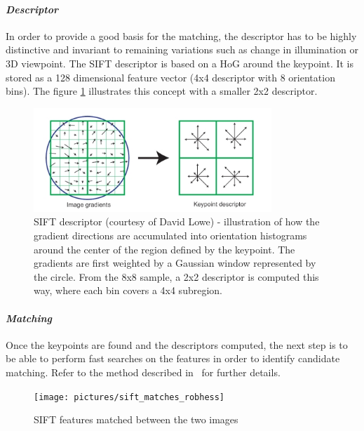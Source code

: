 \paragraph{\emph{Descriptor}}

In order to provide a good basis for the matching, the descriptor has to be highly distinctive and invariant to remaining variations such as change in illumination or 3D viewpoint. The \gls{SIFT} descriptor is based on a \gls{HoG} around the keypoint. It is stored as a 128 dimensional feature vector (4x4 descriptor with 8 orientation bins). The figure \ref{fig:sift_descriptor} illustrates this concept with a smaller 2x2 descriptor.

\begin{figure}[h]
\centering
\includegraphics[width=0.8\textwidth]{figures/sift_descriptor}
\caption{SIFT descriptor (courtesy of David Lowe) - illustration of how the gradient directions are accumulated into orientation histograms around the center of the region defined by the keypoint. The gradients are first weighted by a Gaussian window represented by the circle. From the 8x8 sample, a 2x2 descriptor is computed this way, where each bin covers a 4x4 subregion.}
\label{fig:sift_descriptor}
\end{figure}

\clearpage
\paragraph{\emph{Matching}}

Once the keypoints are found and the descriptors computed, the next step is to be able to perform fast searches on the features in order to identify candidate matching. Refer to the method described in~\cite{lowe_2004_sift} for further details.

\begin{figure}[h]
\centering
\texttt{[image: pictures/sift\_matches\_robhess]}
\caption{SIFT features matched between the two images}
\end{figure}


